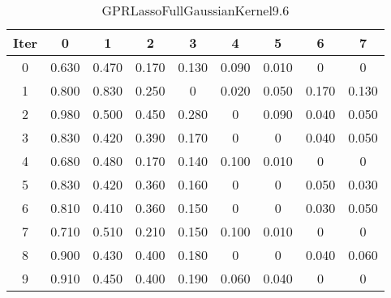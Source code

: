 \begin{table}
	\begin{center}
		\begin{tabular}{|c|c|c|c|c|c|c|c|c|}
			\hline
			Iter & 0 & 1 & 2 & 3 & 4 & 5 & 6 & 7 \\
			\hline
			0 & 0.630 & 0.470 & 0.170 & 0.130 & 0.090 & 0.010 & 0 & 0 \\
			\hline
			1 & 0.800 & 0.830 & 0.250 & 0 & 0.020 & 0.050 & 0.170 & 0.130 \\
			\hline
			2 & 0.980 & 0.500 & 0.450 & 0.280 & 0 & 0.090 & 0.040 & 0.050 \\
			\hline
			3 & 0.830 & 0.420 & 0.390 & 0.170 & 0 & 0 & 0.040 & 0.050 \\
			\hline
			4 & 0.680 & 0.480 & 0.170 & 0.140 & 0.100 & 0.010 & 0 & 0 \\
			\hline
			5 & 0.830 & 0.420 & 0.360 & 0.160 & 0 & 0 & 0.050 & 0.030 \\
			\hline
			6 & 0.810 & 0.410 & 0.360 & 0.150 & 0 & 0 & 0.030 & 0.050 \\
			\hline
			7 & 0.710 & 0.510 & 0.210 & 0.150 & 0.100 & 0.010 & 0 & 0 \\
			\hline
			8 & 0.900 & 0.430 & 0.400 & 0.180 & 0 & 0 & 0.040 & 0.060 \\
			\hline
			9 & 0.910 & 0.450 & 0.400 & 0.190 & 0.060 & 0.040 & 0 & 0 \\
			\hline
		\end{tabular}
	\end{center}
	\caption{GPRLassoFullGaussianKernel9.6}
\end{table}